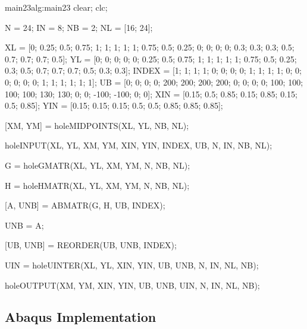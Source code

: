\begin{matlab}{main23}{alg:main23}
clear; clc; 


N = 24;
IN = 8;
NB = 2; %
NL = [16; 24]; %

XL = [0; 0.25; 0.5; 0.75; 1; 1; 1; 1; 1; 0.75; 0.5; 0.25; 0; 0; 0; 0;
      0.3; 0.3; 0.3; 0.5; 0.7; 0.7; 0.7; 0.5];
YL = [0; 0; 0; 0; 0; 0.25; 0.5; 0.75; 1; 1; 1; 1; 1; 0.75; 0.5; 0.25;
      0.3; 0.5; 0.7; 0.7; 0.7; 0.5; 0.3; 0.3];
INDEX = [1; 1; 1; 1; 0; 0; 0; 0; 1; 1; 1; 1; 0; 0; 0; 0; 
         0; 0; 1; 1; 1; 1; 1; 1];
UB = [0; 0; 0; 0; 200; 200; 200; 200; 0; 0; 0; 0; 100; 100; 100; 100; 
      130; 130; 0; 0; -100; -100; 0; 0];
XIN = [0.15; 0.5; 0.85; 0.15; 0.85; 0.15; 0.5; 0.85];
YIN = [0.15; 0.15; 0.15; 0.5; 0.5; 0.85; 0.85; 0.85];

[XM, YM] = holeMIDPOINTS(XL, YL, NB, NL);

holeINPUT(XL, YL, XM, YM, XIN, YIN, INDEX, UB, N, IN, NB, NL);

G = holeGMATR(XL, YL, XM, YM, N, NB, NL);

H = holeHMATR(XL, YL, XM, YM, N, NB, NL);

[A, UNB] = ABMATR(G, H, UB, INDEX);

UNB = A\UNB;

[UB, UNB] = REORDER(UB, UNB, INDEX);

UIN = holeUINTER(XL, YL, XIN, YIN, UB, UNB, N, IN, NL, NB);

holeOUTPUT(XM, YM, XIN, YIN, UB, UNB, UIN, N, IN, NL, NB);
\end{matlab}

\subsection{Abaqus Implementation}
\label{sub:Abaqus_implementation4}%

